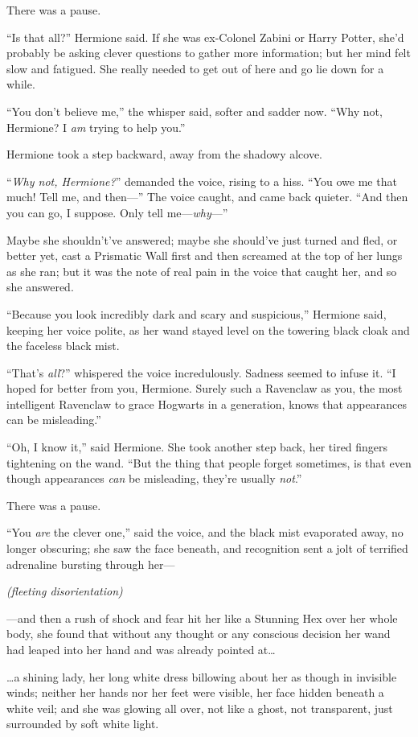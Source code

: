 There was a pause.

“Is that all?” Hermione said. If she was ex-Colonel Zabini or Harry Potter, she’d probably be asking clever questions to gather more information; but her mind felt slow and fatigued. She really needed to get out of here and go lie down for a while.

“You don’t believe me,” the whisper said, softer and sadder now. “Why not, Hermione? I \emph{am} trying to help you.”

Hermione took a step backward, away from the shadowy alcove.

“\emph{Why not, Hermione?}” demanded the voice, rising to a hiss. “You owe me that much! Tell me, and then—” The voice caught, and came back quieter. “And then you can go, I suppose. Only tell me—\emph{why}—”

Maybe she shouldn’t’ve answered; maybe she should’ve just turned and fled, or better yet, cast a Prismatic Wall first and then screamed at the top of her lungs as she ran; but it was the note of real pain in the voice that caught her, and so she answered.

“Because you look incredibly dark and scary and suspicious,” Hermione said, keeping her voice polite, as her wand stayed level on the towering black cloak and the faceless black mist.

“That’s \emph{all}?” whispered the voice incredulously. Sadness seemed to infuse it. “I hoped for better from you, Hermione. Surely such a Ravenclaw as you, the most intelligent Ravenclaw to grace Hogwarts in a generation, knows that appearances can be misleading.”

“Oh, I know it,” said Hermione. She took another step back, her tired fingers tightening on the wand. “But the thing that people forget sometimes, is that even though appearances \emph{can} be misleading, they’re usually \emph{not}.”

There was a pause.

“You \emph{are} the clever one,” said the voice, and the black mist evaporated away, no longer obscuring; she saw the face beneath, and recognition sent a jolt of terrified adrenaline bursting through her—

\emph{(fleeting disorientation)}

—and then a rush of shock and fear hit her like a Stunning Hex over her whole body, she found that without any thought or any conscious decision her wand had leaped into her hand and was already pointed at…

…a shining lady, her long white dress billowing about her as though in invisible winds; neither her hands nor her feet were visible, her face hidden beneath a white veil; and she was glowing all over, not like a ghost, not transparent, just surrounded by soft white light.

